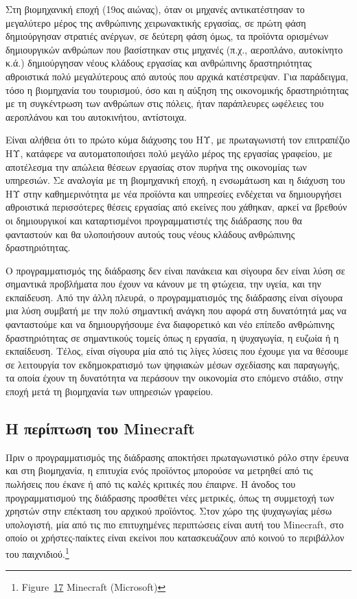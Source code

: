 \documentclass[
]{article}
\begin{document}
Στη βιομηχανική εποχή (19ος αιώνας), όταν οι μηχανές αντικατέστησαν το
μεγαλύτερο μέρος της ανθρώπινης χειρωνακτικής εργασίας, σε πρώτη φάση
δημιούργησαν στρατιές ανέργων, σε δεύτερη φάση όμως, τα προϊόντα
ορισμένων δημιουργικών ανθρώπων που βασίστηκαν στις μηχανές (π.χ.,
αεροπλάνο, αυτοκίνητο κ.ά.) δημιούργησαν νέους κλάδους εργασίας και
ανθρώπινης δραστηριότητας αθροιστικά πολύ μεγαλύτερους από αυτούς που
αρχικά κατέστρεψαν. Για παράδειγμα, τόσο η βιομηχανία του τουρισμού, όσο
και η αύξηση της οικονομικής δραστηριότητας με τη συγκέντρωση των
ανθρώπων στις πόλεις, ήταν παράπλευρες ωφέλειες του αεροπλάνου και του
αυτοκινήτου, αντίστοιχα.

Είναι αλήθεια ότι το πρώτο κύμα διάχυσης του ΗΥ, με πρωταγωνιστή τον
επιτραπέζιο ΗΥ, κατάφερε να αυτοματοποιήσει πολύ μεγάλο μέρος της
εργασίας γραφείου, με αποτέλεσμα την απώλεια θέσεων εργασίας στον πυρήνα
της οικονομίας των υπηρεσιών. Σε αναλογία με τη βιομηχανική εποχή, η
ενσωμάτωση και η διάχυση του ΗΥ στην καθημερινότητα με νέα προϊόντα και
υπηρεσίες ενδέχεται να δημιουργήσει αθροιστικά περισσότερες θέσεις
εργασίας από εκείνες που χάθηκαν, αρκεί να βρεθούν οι δημιουργικοί και
καταρτισμένοι προγραμματιστές της διάδρασης που θα φανταστούν και θα
υλοποιήσουν αυτούς τους νέους κλάδους ανθρώπινης δραστηριότητας.

Ο προγραμματισμός της διάδρασης δεν είναι πανάκεια και σίγουρα δεν είναι
λύση σε σημαντικά προβλήματα που έχουν να κάνουν με τη φτώχεια, την
υγεία, και την εκπαίδευση. Από την άλλη πλευρά, ο προγραμματισμός της
διάδρασης είναι σίγουρα μια λύση συμβατή με την πολύ σημαντική ανάγκη
που αφορά στη δυνατότητά μας να φανταστούμε και να δημιουργήσουμε ένα
διαφορετικό και νέο επίπεδο ανθρώπινης δραστηριότητας σε σημαντικούς
τομείς όπως η εργασία, η ψυχαγωγία, η ευζωία ή η εκπαίδευση. Τέλος,
είναι σίγουρα μία από τις λίγες λύσεις που έχουμε για να θέσουμε σε
λειτουργία τον εκδημοκρατισμό των ψηφιακών μέσων σχεδίασης και
παραγωγής, τα οποία έχουν τη δυνατότητα να περάσουν την οικονομία στο
επόμενο στάδιο, στην εποχή μετά τη βιομηχανία των υπηρεσιών γραφείου.

\hypertarget{ux3b7-ux3c0ux3b5ux3c1ux3afux3c0ux3c4ux3c9ux3c3ux3b7-ux3c4ux3bfux3c5-minecraft}{%
\subsection{Η περίπτωση του
Minecraft}\label{ux3b7-ux3c0ux3b5ux3c1ux3afux3c0ux3c4ux3c9ux3c3ux3b7-ux3c4ux3bfux3c5-minecraft}}

Πριν ο προγραμματισμός της διάδρασης αποκτήσει πρωταγωνιστικό ρόλο στην
έρευνα και στη βιομηχανία, η επιτυχία ενός προϊόντος μπορούσε να
μετρηθεί από τις πωλήσεις που έκανε ή από τις καλές κριτικές που
έπαιρνε. Η άνοδος του προγραμματισμού της διάδρασης προσθέτει νέες
μετρικές, όπως τη συμμετοχή των χρηστών στην επέκταση του αρχικού
προϊόντος. Στον χώρο της ψυχαγωγίας μέσω υπολογιστή, μία από τις πιο
επιτυχημένες περιπτώσεις είναι αυτή του Minecraft, στο οποίο οι
χρήστες-παίκτες είναι εκείνοι που κατασκευάζουν από κοινού το περιβάλλον
του παιχνιδιού.\footnote{Figure~\protect\hyperlink{fig:minecraft-end-user}{17}
  Minecraft (Microsoft)}
\end{document}
